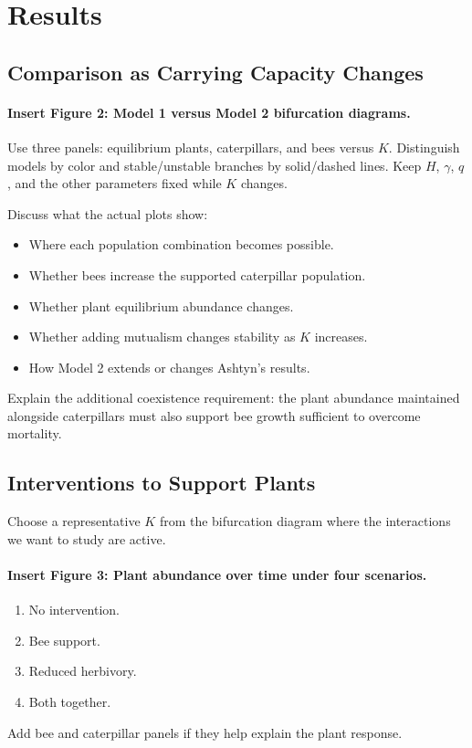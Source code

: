 \documentclass[11pt]{article}
\begin{document}
\section{Results}

\subsection{Comparison as Carrying Capacity Changes}

\paragraph{Insert Figure 2: Model 1 versus Model 2 bifurcation diagrams.}
Use three panels: equilibrium plants, caterpillars, and bees versus $K$.
Distinguish models by color and stable/unstable branches by solid/dashed
lines. Keep $H$, $\gamma$, $q$, and the other parameters fixed while $K$
changes.

Discuss what the actual plots show:
\begin{itemize}
    \item Where each population combination becomes possible.
    \item Whether bees increase the supported caterpillar population.
    \item Whether plant equilibrium abundance changes.
    \item Whether adding mutualism changes stability as $K$ increases.
    \item How Model 2 extends or changes Ashtyn's results.
\end{itemize}

Explain the additional coexistence requirement: the plant abundance
maintained alongside caterpillars must also support bee growth sufficient
to overcome mortality.

\subsection{Interventions to Support Plants}

Choose a representative $K$ from the bifurcation diagram where the
interactions we want to study are active.

\paragraph{Insert Figure 3: Plant abundance over time under four scenarios.}
\begin{enumerate}
    \item No intervention.
    \item Bee support.
    \item Reduced herbivory.
    \item Both together.
\end{enumerate}
Add bee and caterpillar panels if they help explain the plant response.
\end{document}
